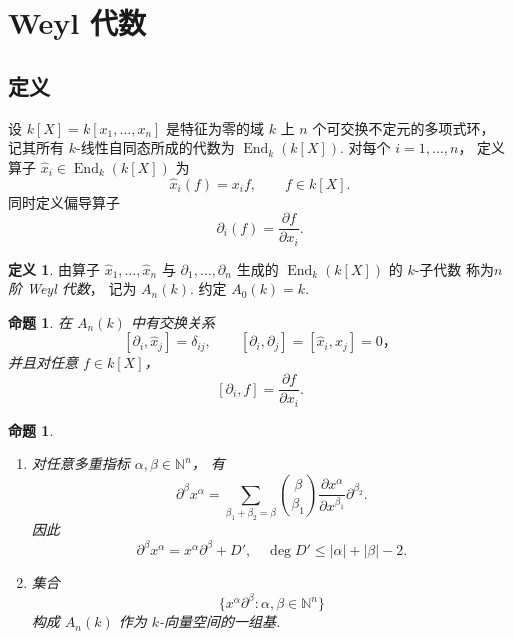 \documentclass[11pt]{article}
\theoremstyle{plain}
\newtheorem{proposition}[theorem]{命题}
\theoremstyle{definition}
\newtheorem{definition}[theorem]{定义}
\theoremstyle{remark}
\newcommand{\End}{\operatorname{End}}
\begin{document}
\section{Weyl 代数}
\subsection{定义}
设 $k[X]=k[x_1,\dots,x_n]$ 是特征为零的域 $k$ 上
$n$ 个可交换不定元的多项式环，
记其所有 $k$-线性自同态所成的代数为 $\End_k(k[X])$.
对每个 $i=1,\dots,n$，
定义算子 $\hat{x}_i\in \End_k(k[X])$ 为
\[
    \hat{x}_i(f)=x_i f, \qquad f\in k[X].
\]
同时定义偏导算子
\[
    \partial_i(f)=\frac{\partial f}{\partial x_i}.
\]
\begin{definition}
    由算子 $\hat{x}_1,\dots,\hat{x}_n$ 与
    $\partial_1,\dots,\partial_n$
    生成的 $\End_k(k[X])$ 的 $k$-子代数
    称为\emph{$n$ 阶 Weyl 代数}，
    记为 $A_n(k)$.
    约定 $A_0(k)=k$.
\end{definition}

\begin{proposition}
    在 $A_n(k)$ 中有交换关系
    \[
        [\partial_i,\hat{x}_j]=\delta_{ij}, \qquad
    [\partial_i,\partial_j]=[\hat{x}_i,\hat{x}_j]=0，
    \]
    并且对任意 $f\in k[X]$，
    \[
        [\partial_i,f]=\frac{\partial f}{\partial x_i}.
    \]
\end{proposition}

\begin{proposition}\label{prop:weyl-basis}
    \begin{enumerate}
        \item 对任意多重指标 $\alpha,\beta\in\mathbb{N}^n$，
              有
              \[
                  \partial^\beta x^\alpha
                  =
                  \sum_{\beta_1+\beta_2=\beta}
                  \binom{\beta}{\beta_1}
                  \frac{\partial x^\alpha}{\partial x^{\beta_1}}
                  \partial^{\beta_2}.
              \]
              因此
              \[
                  \partial^\beta x^\alpha
                  =
                  x^\alpha\partial^\beta+D',
                  \quad
                  \deg D'\le |\alpha|+|\beta|-2.
              \]

        \item 集合
              \[
                  \{x^\alpha\partial^\beta:
                  \alpha,\beta\in\mathbb{N}^n\}
              \]
              构成 $A_n(k)$ 作为 $k$-向量空间的一组基.
    \end{enumerate}
\end{proposition}
\end{document}
